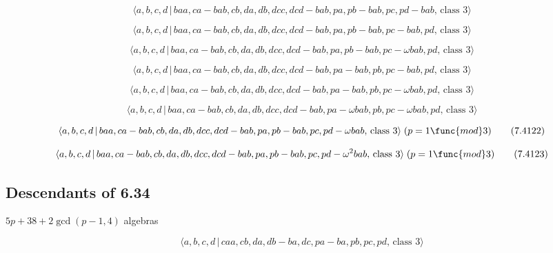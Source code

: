 \documentclass[10pt]{article}
\begin{document}
\begin{equation}
\langle a,b,c,d\,|\,baa,ca-bab,cb,da,db,dcc,dcd-bab,pa,pb-bab,pc,pd-bab,\,%
\text{class }3\rangle  \tag{7.4116}
\end{equation}

\begin{equation}
\langle a,b,c,d\,|\,baa,ca-bab,cb,da,db,dcc,dcd-bab,pa,pb-bab,pc-bab,pd,\,%
\text{class }3\rangle  \tag{7.4117}
\end{equation}

\begin{equation}
\langle a,b,c,d\,|\,baa,ca-bab,cb,da,db,dcc,dcd-bab,pa,pb-bab,pc-\omega
bab,pd,\,\text{class }3\rangle  \tag{7.4118}
\end{equation}

\begin{equation}
\langle a,b,c,d\,|\,baa,ca-bab,cb,da,db,dcc,dcd-bab,pa-bab,pb,pc-bab,pd,\,%
\text{class }3\rangle  \tag{7.4119}
\end{equation}

\begin{equation}
\langle a,b,c,d\,|\,baa,ca-bab,cb,da,db,dcc,dcd-bab,pa-bab,pb,pc-\omega
bab,pd,\,\text{class }3\rangle  \tag{7.4120}
\end{equation}

\begin{equation}
\langle a,b,c,d\,|\,baa,ca-bab,cb,da,db,dcc,dcd-bab,pa-\omega
bab,pb,pc-\omega bab,pd,\,\text{class }3\rangle  \tag{7.4121}
\end{equation}

\begin{equation}
\langle a,b,c,d\,|\,baa,ca-bab,cb,da,db,dcc,dcd-bab,pa,pb-bab,pc,pd-\omega
bab,\,\text{class }3\rangle \;(p=1\func{mod}3)  \tag{7.4122}
\end{equation}

\begin{equation}
\langle a,b,c,d\,|\,baa,ca-bab,cb,da,db,dcc,dcd-bab,pa,pb-bab,pc,pd-\omega
^{2}bab,\,\text{class }3\rangle \;(p=1\func{mod}3)  \tag{7.4123}
\end{equation}

\subsection{Descendants of 6.34}

$5p+38+2\gcd (p-1,4)$ algebras

\begin{equation}
\langle a,b,c,d\,|\,caa,cb,da,db-ba,dc,pa-ba,pb,pc,pd,\,\text{class }3\rangle
\tag{7.4124}
\end{equation}
\end{document}
